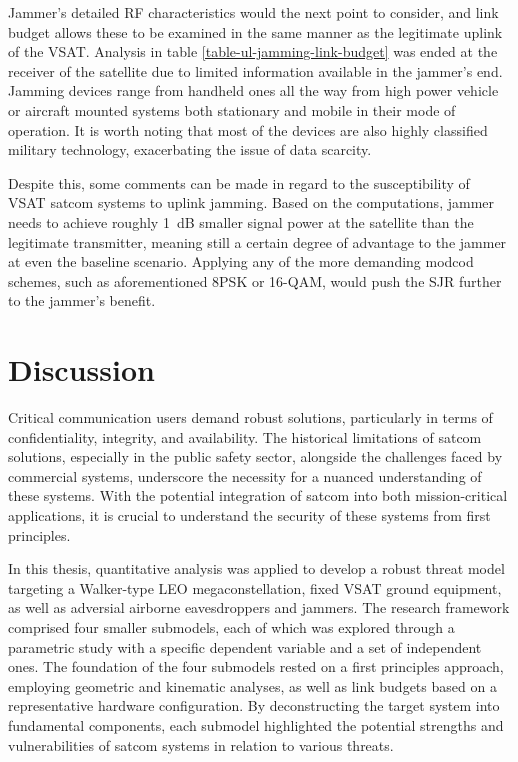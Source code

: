 \documentclass[english, 12pt, a4paper, elec, utf8, a-1b, online]{aaltothesis}
\begin{document}
Jammer's detailed RF characteristics would the next point to consider, and link budget allows these to be examined in the same manner as the legitimate uplink of the VSAT.
Analysis in table \ref{table-ul-jamming-link-budget} was ended at the receiver of the satellite due to limited information available in the jammer's end.
Jamming devices range from handheld ones all the way from high power vehicle or aircraft mounted systems both stationary and mobile in their mode of operation.
It is worth noting that most of the devices are also highly classified military technology, exacerbating the issue of data scarcity.

Despite this, some comments can be made in regard to the susceptibility of VSAT satcom systems to uplink jamming.
Based on the computations, jammer needs to achieve roughly \SI{1}{\deci\bel} smaller signal power at the satellite than the legitimate transmitter, meaning still a certain degree of advantage to the jammer at even the baseline scenario.
Applying any of the more demanding modcod schemes, such as aforementioned 8PSK or 16-QAM, would push the SJR further to the jammer's benefit.

\clearpage

\section{Discussion}

Critical communication users demand robust solutions, particularly in terms of confidentiality, integrity, and availability. The historical limitations of satcom solutions, especially in the public safety sector, alongside the challenges faced by commercial systems, underscore the necessity for a nuanced understanding of these systems. With the potential integration of satcom into both mission-critical applications, it is crucial to understand the security of these systems from first principles.

In this thesis, quantitative analysis was applied to develop a robust threat model targeting a Walker-type LEO megaconstellation, fixed VSAT ground equipment, as well as adversial airborne eavesdroppers and jammers. The research framework comprised four smaller submodels, each of which was explored through a parametric study with a specific dependent variable and a set of independent ones.
The foundation of the four submodels rested on a first principles approach, employing geometric and kinematic analyses, as well as link budgets based on a representative hardware configuration.
By deconstructing the target system into fundamental components, each submodel highlighted the potential strengths and vulnerabilities of satcom systems in relation to various threats.
\end{document}
